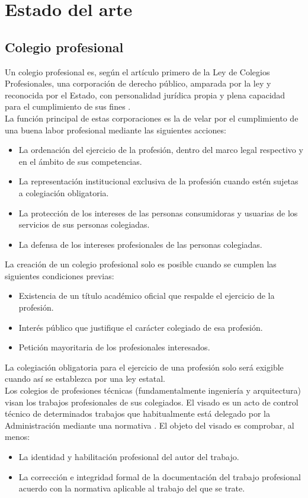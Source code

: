 \chapter{Estado del arte}

\section{Colegio profesional}
Un colegio profesional es, según el artículo primero de la Ley de Colegios Profesionales, una corporación de derecho público, amparada por la ley y reconocida por el Estado, con personalidad jurídica propia y plena capacidad para el cumplimiento de sus fines \cite{colegiosjunta}. \\

La función principal de estas corporaciones es la de velar por el cumplimiento de una buena labor profesional mediante las siguientes acciones:
\begin{itemize}
\item La ordenación del ejercicio de la profesión, dentro del marco legal respectivo y en el ámbito de sus competencias.
\item La representación institucional exclusiva de la profesión cuando estén sujetas a colegiación obligatoria.
\item La protección de los intereses de las personas consumidoras y usuarias de los servicios de sus personas colegiadas.
\item La defensa de los intereses profesionales de las personas colegiadas. \\
\end{itemize}

La creación de un colegio profesional solo es posible cuando se cumplen las siguientes condiciones previas:
\begin{itemize}
\item Existencia de un título académico oficial que respalde el ejercicio de la profesión.
\item Interés público que justifique el carácter colegiado de esa profesión.
\item Petición mayoritaria de los profesionales interesados.  \\
\end{itemize}

La colegiación obligatoria para el ejercicio de una profesión solo será exigible cuando así se establezca por una ley estatal. \\

Los colegios de profesiones técnicas (fundamentalmente ingeniería y arquitectura) visan los trabajos profesionales de sus colegiados. El visado es un acto de control técnico de determinados trabajos que habitualmente está delegado por la Administración mediante una normativa \cite{colegioswikipedia}. El objeto del visado es comprobar, al menos:
\begin{itemize}
\item La identidad y habilitación profesional del autor del trabajo.
\item La corrección e integridad formal de la documentación del trabajo profesional acuerdo con la normativa aplicable al trabajo del que se trate.
\end{itemize}


